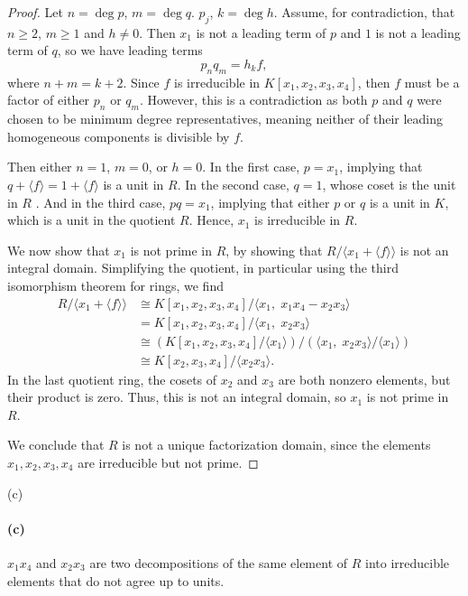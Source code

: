 \documentclass[12pt]{article}
\newenvironment{fullbox}{\begin{lrbox}{\savefullbox}\begin{minipage}{\dimexpr\textwidth-2\fboxsep\relax}}{\end{minipage}\end{lrbox}\begin{center}\framebox[\textwidth]{\usebox{\savefullbox}}\end{center}}
\newenvironment{pbox}[1][]{\begin{fullbox}\ifx#1\empty\else\paragraph{#1}\fi}{\end{fullbox}}
\theoremstyle{definition}
\newcommand{\<}{\langle}
\renewcommand{\>}{\rangle}
\newcommand{\isom}{\cong}
\begin{document}
\begin{proof}
    Let $n = \deg p$, $m = \deg q$. $p_j$, $k = \deg h$. Assume, for contradiction, that $n \geq 2$, $m \geq 1$ and $h \ne 0$. Then $x_1$ is not a leading term of $p$ and $1$ is not a leading term of $q$, so we have leading terms
    \[
        p_nq_m = h_kf,
    \]
    where $n + m = k + 2$. Since $f$ is irreducible in $K[x_1, x_2, x_3, x_4]$, then $f$ must be a factor of either $p_n$ or $q_m$. However, this is a contradiction as both $p$ and $q$ were chosen to be minimum degree representatives, meaning neither of their leading homogeneous components is divisible by $f$. 

    Then either $n = 1$, $m = 0$, or $h = 0$. In the first case, $p = x_1$, implying that $q + \<f\> = 1 + \<f\>$ is a unit in $R$. In the second case, $q = 1$, whose coset is the unit in $R$ . And in the third case, $pq = x_1$, implying that either $p$ or $q$ is a unit in $K$, which is a unit in the quotient $R$. Hence, $x_1$ is irreducible in $R$.

    We now show that $x_1$ is not prime in $R$, by showing that $R/\<x_1 + \<f\>\>$ is not an integral domain. Simplifying the quotient, in particular using the third isomorphism theorem for rings, we find
    \begin{align*}
        R/\<x_1 + \<f\>\>
            &\isom K[x_1, x_2, x_3, x_4]/\<x_1,\; x_1x_4 - x_2x_3\> \\
            &= K[x_1, x_2, x_3, x_4]/\<x_1,\; x_2x_3\> \\
            &\isom (K[x_1, x_2, x_3, x_4]/\<x_1\>) / (\<x_1,\; x_2x_3\>/\<x_1\>) \\
            &\isom K[x_2, x_3, x_4] / \<x_2x_3\>.
    \end{align*}
    In the last quotient ring, the cosets of $x_2$ and $x_3$ are both nonzero elements, but their product is zero. Thus, this is not an integral domain, so $x_1$ is not prime in $R$.

    We conclude that $R$ is not a unique factorization domain, since the elements $x_1, x_2, x_3, x_4$ are irreducible but not prime.



\end{proof}



\begin{pbox}[(c)]
    $x_1x_4$ and $x_2x_3$ are two decompositions of the same element of $R$ into irreducible elements that do not agree up to units.
\end{pbox}
\end{document}
